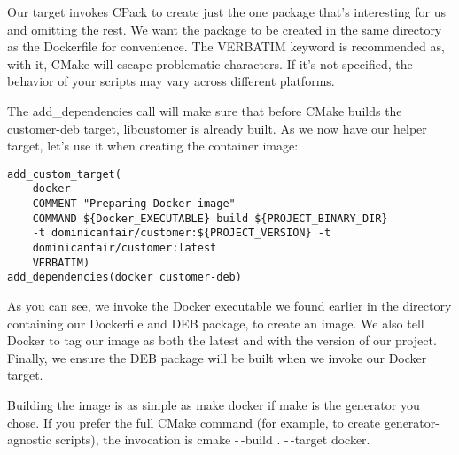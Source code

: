Our target invokes CPack to create just the one package that's interesting for us and omitting the rest. We want the package to be created in the same directory as the Dockerfile for convenience. The VERBATIM keyword is recommended as, with it, CMake will escape problematic characters. If it's not specified, the behavior of your scripts may vary across different platforms.

The add\_dependencies call will make sure that before CMake builds the customer-deb target, libcustomer is already built. As we now have our helper target, let's use it when creating the container image:

\begin{lstlisting}[style=styleCMake]
add_custom_target(
	docker
	COMMENT "Preparing Docker image"
	COMMAND ${Docker_EXECUTABLE} build ${PROJECT_BINARY_DIR}
	-t dominicanfair/customer:${PROJECT_VERSION} -t
	dominicanfair/customer:latest
	VERBATIM)
add_dependencies(docker customer-deb)
\end{lstlisting}

As you can see, we invoke the Docker executable we found earlier in the directory containing our Dockerfile and DEB package, to create an image. We also tell Docker to tag our image as both the latest and with the version of our project. Finally, we ensure the DEB package will be built when we invoke our Docker target.

Building the image is as simple as make docker if make is the generator you chose. If you prefer the full CMake command (for example, to create generator-agnostic scripts), the invocation is cmake -\,-build . -\,-target docker.














